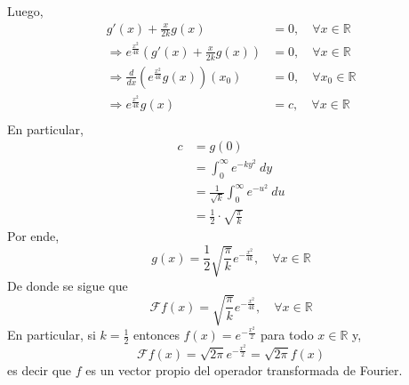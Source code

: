 \documentclass[12pt]{report}
\newcounter{it}
\theoremstyle{largebreak}
\newcommand{\fou}[1]{\ensuremath{\mathcal{F}#1}}
\begin{document}
\begin{exa}
        Luego, 
        \begin{equation*}
            \begin{split}
                g'(x)+\frac{x}{2k}g(x)&=0,\quad\forall x\in\mathbb{R}\\
                \Rightarrow e^{\frac{x^2}{4k}}\left(g'(x)+\frac{x}{2k}g(x)\right)&=0,\quad\forall x\in\mathbb{R}\\
                \Rightarrow \frac{d}{dx}\left(e^{\frac{x^2}{4k}}g(x) \right)(x_0)&=0,\quad\forall x_0\in\mathbb{R} \\
                \Rightarrow e^{\frac{x^2}{4k}}g(x)&=c,\quad\forall x\in\mathbb{R}\\
            \end{split}
        \end{equation*}
        En particular,
        \begin{equation*}
            \begin{split}
                c&=g(0)\\
                &=\int_0^\infty e^{ -ky^2}\:dy\\
                &=\frac{1}{\sqrt{k}}\int_0^\infty e^{-u^2}\:du\\
                &=\frac{1}{2}\cdot\sqrt{\frac{\pi}{k}}
            \end{split}
        \end{equation*}
        Por ende,
        \begin{equation*}
            g(x)=\frac{1}{2}\sqrt{\frac{\pi}{k}}e^{ -\frac{x^2}{4k}},\quad\forall x\in\mathbb{R}
        \end{equation*}
        De donde se sigue que
        \begin{equation*}
            \fou{f}(x)=\sqrt{\frac{\pi}{k}}e^{ -\frac{x^2}{4k}}, \quad\forall x\in\mathbb{R}
        \end{equation*}
        En particular, si $k=\frac{1}{2}$ entonces $f(x)=e^{-\frac{x^2}{2}}$ para todo $x\in\mathbb{R}$ y,
        \begin{equation*}
            \fou{f}(x)=\sqrt{2\pi}e^{ -\frac{x^2}{2}}=\sqrt{2\pi}f(x)
        \end{equation*}
        es decir que $f$ es un vector propio del operador transformada de Fourier.
    \end{exa}
\end{document}
